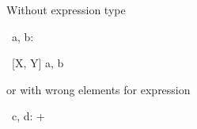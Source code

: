 \documentclass{article}
\begin{document}
Without expression type
%
\begin{circus}
  \circchannel\ a, b:
\end{circus}
\begin{circus}
  \circchannel\ [X, Y] a, b
\end{circus}%
%
or with wrong elements for expression
%
\begin{circus}
  \circchannel\ c, d: +
\end{circus}%
%
%
%
%
\end{document}
